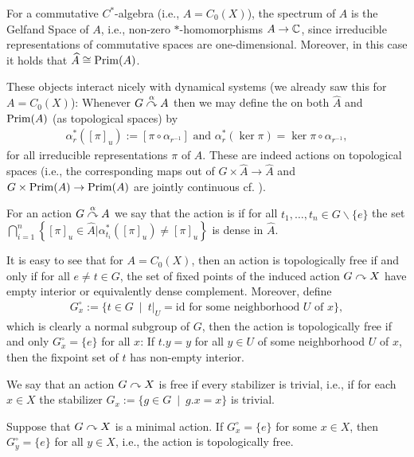\begin{remark}
	For a commutative $C^*$-algebra (i.e., $A = C_0(X)$), the spectrum of $A$ is the Gelfand Space of $A$, i.e., non-zero $*$-homomorphisms $A \to \mathbb{C}$, since irreducible representations of commutative spaces are one-dimensional. Moreover, in this case it holds that $\widehat{A} \cong \mathrm{Prim}(A)$.
\end{remark}
These objects interact nicely with dynamical systems (we already saw this for $A= C_0(X)$): Whenever $G \stackrel{\alpha}{\curvearrowright} A$ then we may define the  on both $\hat A$ and $\mathrm{Prim}(A)$ (as topological spaces) by
\begin{align*}
	\alpha_r^*([\pi]_u) := [\pi \circ \alpha_{r^{-1}}] \text{ and } \alpha_{r}^*(\ker \pi) = \ker \pi \circ \alpha_{r^{-1}},
\end{align*}
for all irreducible representations $\pi$ of $A$. These are indeed actions on topological spaces (i.e., the corresponding maps out of $G \times \hat A \to \hat A$ and $G \times \mathrm{Prim}(A) \to \mathrm{Prim}(A)$ are jointly continuous cf. \cite[Lemma 7.1]{williamsmorita}).
\begin{definition}
	For an action $G \stackrel{\alpha}{\curvearrowright} A$ we say that the action is  if for all $t_1,\dots,t_n \in G\backslash\{e\}$ the set $\bigcap_{i=1}^n \left\{ [\pi]_u \in \hat A | \alpha_{t_i}^*([\pi]_u)\neq [\pi]_u \right\}$ is dense in $\hat A$.
\end{definition}
\begin{remark}
	It is easy to see that for $A=C_0(X)$, then an action is topologically free if and only if for all $e \neq t \in G$, the set of fixed points of the induced action $G \stackrel{}{\curvearrowright} X$ have empty interior or equivalently dense complement. Moreover, define 
	\begin{align*}
		G_x^\circ := \{t \in G \ \mid \ t|_U = \mathrm{id} \text{ for some neighborhood } U \text{ of } x\},
	\end{align*}
	which is clearly a normal subgroup of $G$, then the action is topologically free if and only $G_x^\circ = \{e\}$ for all $x$: If $t.y= y$ for all $y \in U$ of some neighborhood $U$ of $x$, then the fixpoint set of $t$ has non-empty interior.
\end{remark}
\begin{definition}
	We say that an action $G \stackrel{}{\curvearrowright} X$ is free if every stabilizer is trivial, i.e., if for each $x \in X$ the stabilizer $G_x :=\{g \in G \ \mid \ g.x =x\}$ is trivial.
\end{definition}
\begin{lemma}
	Suppose that $G \stackrel{}{\curvearrowright} X$ is a minimal action. If $G_x^\circ = \{e\}$ for some $x \in X$, then $G_y^\circ = \{e\}$ for all $y \in X$, i.e., the action is topologically free.
	\label{topfreeminimal}
\end{lemma}
